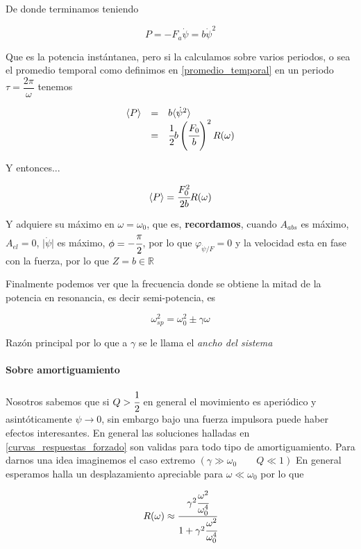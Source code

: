\documentclass[a4paper,spanish]{article}
\def\R {\mathbb{R}}
\numberwithin{equation}{section}
\begin{document}
De donde terminamos teniendo
	
\begin{equation}
P=-F_a \dot{\psi}=b\dot{\psi}^2
\end{equation}


Que es la potencia inst\'antanea, pero si la calculamos sobre varios periodos, o sea el promedio temporal como definimos en \ref{promedio_temporal} en un periodo $\tau = \dfrac{2\pi}{\omega}$ tenemos

\[
\begin{array}{rcl}
\langle{P}\rangle&=&b\langle{\dot{\psi}^2}\rangle \\
&=&\cfrac{1}{2} b \left(\cfrac{F_0}{b}\right)^2 R(\omega)
\end{array}
\]

Y entonces...

\[\langle{P}\rangle= \cfrac{F_0^2}{2b}R(\omega)\]

Y adquiere su m\'aximo en $\omega=\omega_0$, que es, \textbf{recordamos}, cuando $A_{abs}$ es m\'aximo, $A_{el}=0$, $\vert{\dot{\psi}}\vert$ es m\'aximo, $\phi=-\cfrac{\pi}{2}$, por lo que $\varphi_{\dot{\psi}/F}=0$ y la velocidad esta en fase con la fuerza, por lo que $Z=b \in\R $

Finalmente podemos ver que la frecuencia donde se obtiene la mitad de la potencia en resonancia, es decir semi-potencia, es
 
	\begin{equation}
		\omega_{sp}^2 = \omega_0^2 \pm \gamma \omega
		\label{eq:oscilador_forzado_potencia_semipotencia}
	\end{equation}

Raz\'on principal por lo que a $\gamma$ se le llama el \textit{ancho del sistema}

\paragraph{Sobre amortiguamiento}
Nosotros sabemos que si $Q>\cfrac{1}{2}$ en general el movimiento es aperi\'odico y asint\'oticamente $\psi \rightarrow 0$, sin embargo bajo una fuerza impulsora puede haber efectos interesantes. En general las soluciones halladas en \ref{curvas_respuestas_forzado} son validas para todo tipo de amortiguamiento. Para darnos una idea imaginemos el caso extremo $(\gamma \gg \omega_0 \qquad Q\ll 1)$ En general esperamos halla un desplazamiento apreciable para $\omega\ll\omega_0$ por lo que

\begin{equation}
R(\omega)\approx \cfrac{\gamma^2 \cfrac{\omega ^2}{\omega_0  ^4}}{1+{\gamma^2\cfrac{\omega^2}{\omega_0 ^4}}}
\end{equation}
\end{document}
